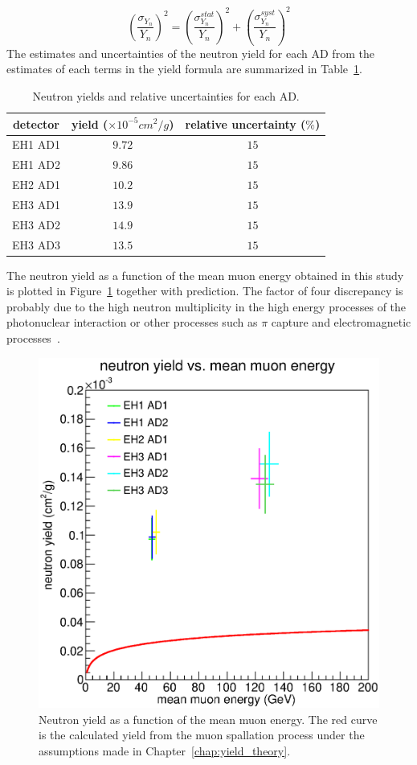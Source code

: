 \begin{equation}
	\left(\frac{\sigma_{Y_n}}{Y_n}\right)^2=\left(\frac{\sigma^{stat}_{Y_n}}{Y_n}\right)^2+\left(\frac{\sigma^{syst}_{Y_n}}{Y_n}\right)^2
\end{equation}
The estimates and uncertainties of the neutron yield for each AD from the estimates of each terms in the yield formula are summarized in Table~\ref{tab:yield}.
\begin{table}
	\centering
	\begin{tabular}{|c|c|c|}
		\hline
		detector & yield ($\times 10^{-5} cm^2/g$) & relative uncertainty ($\%$) \\
		\hline
		EH1 AD1 & $9.72$ & $15$ \\
		\hline
		EH1 AD2 & $9.86$ & $15$ \\
		\hline
		EH2 AD1 & $10.2$ & $15$ \\
		\hline
		EH3 AD1 & $13.9$ & $15$ \\
		\hline
		EH3 AD2 & $14.9$ & $15$ \\
		\hline
		EH3 AD3 & $13.5$ & $15$ \\
		\hline
	\end{tabular}
	\caption{Neutron yields and relative uncertainties for each AD.}
	\label{tab:yield}
\end{table}
The neutron yield as a function of the mean muon energy obtained in this study is plotted in Figure~\ref{fig:yield_vs_energy} together with prediction. The factor of four discrepancy is probably due to the high neutron multiplicity in the high energy processes of the photonuclear interaction or other processes such as $\pi$ capture and electromagnetic processes~\cite{Empl2014}.
\begin{figure}[ht]
	\centering
	\includegraphics[width=.8\textwidth]{figures/chap7/yield_vs_energy_thesis.eps}
	\caption{Neutron yield as a function of the mean muon energy. The red curve is the calculated yield from the muon spallation process under the assumptions made in Chapter~\ref{chap:yield_theory}.}
	\label{fig:yield_vs_energy}
\end{figure}

